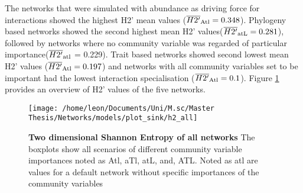 \documentclass[12pt,a4paper]{article}
\begin{document}
\begin{table}[H]
\centering
\caption{Mean network robustness after extinction simulation with initial extinction on the lower trophic level}
\label{tab:auc_lower}
\end{table}

The networks that were simulated with abundance as driving force for interactions showed the highest H2' mean values ($\overline{H2'}\textsubscript{Atl} = 0.348$). Phylogeny based networks showed the second highest mean H2' values($\overline{H2'}\textsubscript{atL} = 0.281$), followed by networks where no community variable was regarded of particular importance($\overline{H2'}\textsubscript{atl}$ = 0.229). Trait based networks showed second lowest mean H2' values ($\overline{H2'}\textsubscript{Atl} = 0.197$) and networks with all community variables set to be important had the lowest interaction specialisation ($\overline{H2'}\textsubscript{Atl} = 0.1$). Figure \ref{fig:h2} provides an overview of H2' values of the five networks.
\begin{figure}[H]
	 \texttt{[image: /home/leon/Documents/Uni/M.sc/Master Thesis/Networks/models/plot\_sink/h2\_all]}
	 \caption{\textbf{Two dimensional Shannon Entropy of all networks} The boxplots show all scenarios of different community variable importances noted as Atl, aTl, atL, and, ATL. Noted as atl are values for a default network without specific importances of the community variables}
	 \label{fig:h2}
\end{figure}
\end{document}
